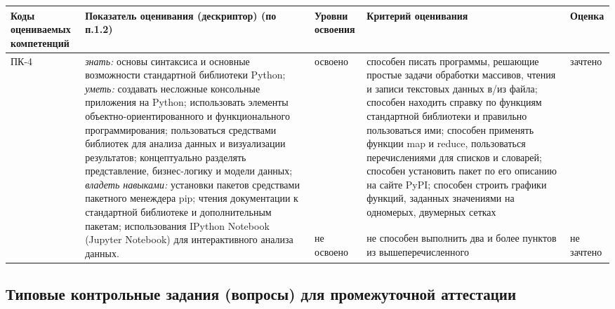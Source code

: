 \documentclass[a4paper,12pt]{article}
\begin{document}
\begin{longtable}{|p{15mm}|p{53mm}|p{16mm}|p{43mm}|p{14mm}|}
\hline
  \centering\small Коды оцениваемых компетенций
& \centering Показатель оценивания (дескриптор) (по п.1.2) 
& \centering\small Уровни освоения 
& \centering Критерий оценивания 
& \centering\small\arraybackslash Оценка
\\
\hline
\multirow{2}{15mm}{ПК-4}
&
\multirow{2}{53mm}{\parbox{53mm}{%
\vrule width 0pt height 10pt \emph{знать:}\newline
основы синтаксиса и основные возможности стандартной библиотеки Python; \newline
\emph{уметь:}\newline
создавать несложные консольные приложения на Python; использовать элементы объект\-но-ориен\-ти\-ро\-ван\-но\-го и функционального программирования; пользоваться средствами библиотек для анализа данных и визуализации результатов; концептуально разделять представление, бизнес-логику и модели данных; \newline
\emph{владеть навыками:}\newline
установки пакетов средствами пакетного менеждера pip; чтения документации к стандартной библиотеке и дополнительным пакетам; использования IPython Notebook (Jupyter Notebook) для интерактивного анализа данных. 
}}
& 
освоено & способен писать программы, решающие простые задачи обработки массивов,
чтения и записи текстовых данных в/из файла; способен находить справку
по функциям стандартной библиотеки и правильно пользоваться ими;
способен применять функции map и reduce, пользоваться перечислениями
для списков и словарей; способен установить пакет по его описанию на сайте PyPI;
способен строить графики функций, заданных   значениями на одномерых, двумерных сетках & зачтено 
\\ 
\cline{3-5}

& & не освоено & не способен выполнить два и более пунктов из вышеперечисленного\linebreak~\linebreak & не зачтено 
\\


\hline
\end{longtable}



\newpage\subsection{Типовые контрольные задания (вопросы) для промежуточной аттестации}
\end{document}
